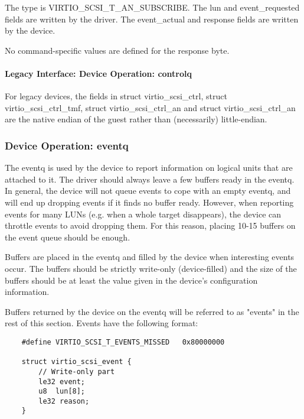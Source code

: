  The type is VIRTIO_SCSI_T_AN_SUBSCRIBE. The lun and
  event_requested fields are written by the driver. The
  event_actual and response fields are written by the device.

  No command-specific values are defined for the response byte.

\paragraph{Legacy Interface: Device Operation: controlq}\label{sec:Device Types / SCSI Host Device / Device Operation / Device Operation: controlq / Legacy Interface: Device Operation: controlq}

For legacy devices, the fields in struct virtio_scsi_ctrl, struct
virtio_scsi_ctrl_tmf, struct virtio_scsi_ctrl_an and struct
virtio_scsi_ctrl_an are the native endian of the guest rather than
(necessarily) little-endian.


\subsubsection{Device Operation: eventq}\label{sec:Device Types / SCSI Host Device / Device Operation / Device Operation: eventq}

The eventq is used by the device to report information on logical
units that are attached to it. The driver should always leave a
few buffers ready in the eventq. In general, the device will not
queue events to cope with an empty eventq, and will end up
dropping events if it finds no buffer ready. However, when
reporting events for many LUNs (e.g. when a whole target
disappears), the device can throttle events to avoid dropping
them. For this reason, placing 10-15 buffers on the event queue
should be enough.

Buffers are placed in the eventq and filled by the device when
interesting events occur. The buffers should be strictly
write-only (device-filled) and the size of the buffers should be
at least the value given in the device's configuration
information.

Buffers returned by the device on the eventq will be referred to
as "events" in the rest of this section. Events have the
following format:

\begin{lstlisting}
	#define VIRTIO_SCSI_T_EVENTS_MISSED   0x80000000

	struct virtio_scsi_event {
		// Write-only part
		le32 event;
		u8  lun[8];
		le32 reason;
	}
\end{lstlisting}

